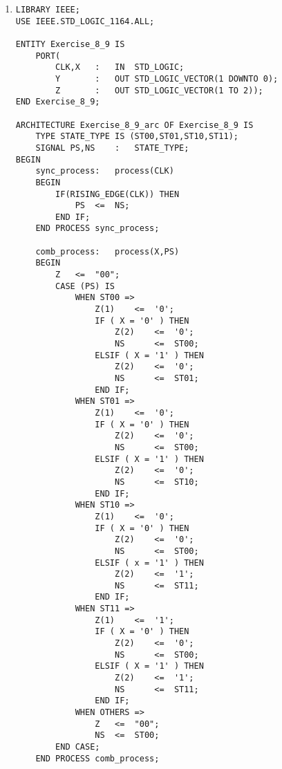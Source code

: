 \begin{enumerate}
\begin{lstlisting}
	comb_process:	process(X,PS) 
	BEGIN
		Z	<=	"00";
		CASE (PS) IS
			WHEN ST000 =>
				Z	<=	"00";
				IF ( X = '0' ) THEN
					NS	<=	ST000;
				ELSIF ( X = '1' ) THEN
					NS	<=	ST001;
				END IF;
			WHEN ST001 =>
				Z	<=	"00";
				IF ( X = '0' ) THEN
					NS	<=	ST001;
				ELSIF ( X = '1' ) THEN
					NS	<=	ST010;
				END IF;
			WHEN ST010 =>
				Z	<=	"00";
				IF ( X = '0' ) THEN
					NS	<=	ST010;
				ELSIF ( X = '1' ) THEN
					NS	<=	ST011;
				END IF;
			WHEN ST011 =>
				Z	<=	"10";
				IF ( X = '0' ) THEN
					NS	<=	ST011;
				ELSIF ( X = '1' ) THEN
					NS	<= ST100;
				END IF;
			WHEN ST100 =>
				Z	<=	"01";
				If ( X = '0' ) THEN
					NS	<=	ST000;
				ELSIF ( X = '1' ) THEN
					NS	<=	ST101;
				END IF;
			WHEN ST101 =>
				Z	<=	"11";
				IF ( X = '0' ) THEN
					NS	<=	ST101;
				ELSIF ( X = '1' ) THEN
					NS	<=	ST110;
				END IF;
			WHEN ST110 =>
				Z	<=	"11";
				IF ( X = '0' ) THEN
					NS	<=	ST110;
				ELSIF ( X = '1' ) THEN
					NS	<=	ST111;
				END IF;
			WHEN ST111 =>
				Z	<=	"11";
				IF ( X = '0' ) THEN
					NS	<=	ST111;
				ELSIF ( X = '1' ) THEN
					NS	<=	ST000;
				END IF;
			WHEN OTHERS =>
				Z	<=	"00";
				NS	<=	ST000;
		END CASE;
	END PROCESS comb_process;

		WITH PS SELECT
		Y	<=	"000" WHEN ST000,
				"001" WHEN ST001,
				"010" WHEN ST010,
				"011" WHEN ST011,
				"100" WHEN ST100,
				"101" WHEN ST101,
				"110" WHEN ST110,
				"111" WHEN ST111,
				"000" WHEN OTHERS;
END Exercise_8_8_arc;
	\end{lstlisting}

	\item \begin{lstlisting}
LIBRARY IEEE;
USE IEEE.STD_LOGIC_1164.ALL;

ENTITY Exercise_8_9 IS
	PORT(
		CLK,X	:	IN	STD_LOGIC;
		Y		:	OUT	STD_LOGIC_VECTOR(1 DOWNTO 0);
		Z		:	OUT	STD_LOGIC_VECTOR(1 TO 2));
END Exercise_8_9;

ARCHITECTURE Exercise_8_9_arc OF Exercise_8_9 IS
	TYPE STATE_TYPE IS (ST00,ST01,ST10,ST11);
	SIGNAL PS,NS	:	STATE_TYPE;
BEGIN
	sync_process:	process(CLK) 
	BEGIN
		IF(RISING_EDGE(CLK)) THEN
			PS	<=	NS;
		END IF;
	END PROCESS sync_process;

	comb_process:	process(X,PS) 
	BEGIN
		Z	<=	"00";
		CASE (PS) IS
			WHEN ST00 =>
				Z(1)	<=	'0';
				IF ( X = '0' ) THEN
					Z(2)	<=	'0';
					NS		<=	ST00;
				ELSIF ( X = '1' ) THEN
					Z(2)	<=	'0';
					NS		<=	ST01;
				END IF;
			WHEN ST01 =>
				Z(1)	<=	'0';
				IF ( X = '0' ) THEN
					Z(2)	<=	'0';
					NS		<=	ST00;
				ELSIF ( X = '1' ) THEN
					Z(2)	<=	'0';
					NS		<=	ST10;
				END IF;
			WHEN ST10 =>
				Z(1)	<=	'0';
				IF ( X = '0' ) THEN
					Z(2)	<=	'0';
					NS		<=	ST00;
				ELSIF ( x = '1' ) THEN
					Z(2)	<=	'1';
					NS		<=	ST11;
				END IF;
			WHEN ST11 =>
				Z(1)	<=	'1';
				IF ( X = '0' ) THEN
					Z(2)	<=	'0';
					NS		<=	ST00;
				ELSIF ( X = '1' ) THEN
					Z(2)	<=	'1';
					NS		<=	ST11;
				END IF;
			WHEN OTHERS =>
				Z	<=	"00";
				NS	<=	ST00;
		END CASE;
	END PROCESS comb_process;


\end{lstlisting}
\end{enumerate}
